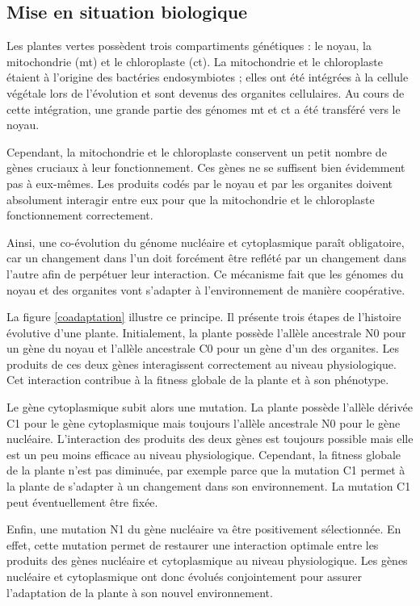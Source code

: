 \documentclass[a4paper]{article}
\begin{document}
\subsection{Mise en situation biologique}

Les plantes vertes possèdent trois compartiments génétiques : le noyau, la mitochondrie (mt) et le chloroplaste (ct). La mitochondrie et le chloroplaste étaient à l'origine des bactéries endosymbiotes ; elles ont été intégrées à la cellule végétale lors de l'évolution et sont devenus des organites cellulaires. Au cours de cette intégration, une grande partie des génomes mt et ct a été transféré vers le noyau. 

Cependant, la mitochondrie et le chloroplaste conservent un petit nombre de gènes cruciaux à leur fonctionnement. Ces gènes ne se suffisent bien évidemment pas à eux-mêmes. Les produits codés par le noyau et par les organites doivent absolument interagir entre eux pour que la mitochondrie et le chloroplaste fonctionnement correctement. 

Ainsi, une co-évolution du génome nucléaire et cytoplasmique paraît obligatoire, car un changement dans l'un doit forcément être reflété par un changement dans l'autre afin de perpétuer leur interaction. Ce mécanisme fait que les génomes du noyau et des organites vont s'adapter à l'environnement de manière coopérative.

La figure \ref{coadaptation} illustre ce principe. Il présente trois étapes de l'histoire évolutive d'une plante. Initialement, la plante possède l'allèle ancestrale N0 pour un gène du noyau et l'allèle ancestrale C0 pour un gène d'un des organites. Les produits de ces deux gènes interagissent correctement au niveau physiologique. Cet interaction contribue à la fitness globale de la plante et à son phénotype.

Le gène cytoplasmique subit alors une mutation. La plante possède l'allèle dérivée C1 pour le gène cytoplasmique mais toujours l'allèle ancestrale N0 pour le gène nucléaire. L'interaction des produits des deux gènes est toujours possible mais elle est un peu moins efficace au niveau physiologique. Cependant, la fitness globale de la plante n'est pas diminuée, par exemple parce que la mutation C1 permet à la plante de s'adapter à un changement dans son environnement. La mutation C1 peut éventuellement être fixée.

Enfin, une mutation N1 du gène nucléaire va être positivement sélectionnée. En effet, cette mutation permet de restaurer une interaction optimale entre les produits des gènes nucléaire et cytoplasmique au niveau physiologique. Les gènes nucléaire et cytoplasmique ont donc évolués conjointement pour assurer l'adaptation de la plante à son nouvel environnement. 
\end{document}
